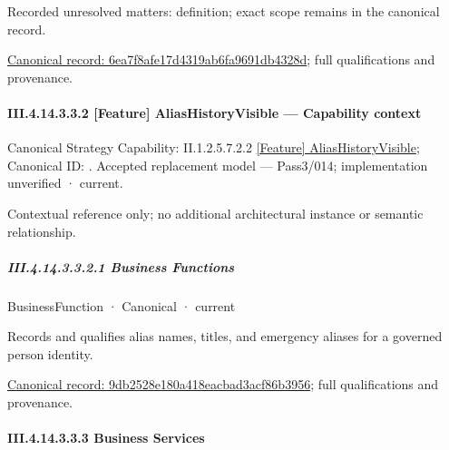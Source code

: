 {\small Recorded unresolved matters: definition; exact scope remains in the canonical record.}\par
{\footnotesize \href{../../../../continuum/business/business-process/6ea7f8afe17d4319ab6fa9691db4328d.md}{Canonical record: 6ea7f8afe17d4319ab6fa9691db4328d}; full qualifications and provenance.}\par
\paragraph*{III.4.14.3.3.2 [Feature] AliasHistoryVisible — Capability context}
\label{navigation:III.4.14.3.3.2}

{\small Canonical Strategy Capability: II.1.2.5.7.2.2 \hyperref[element:5d8ab81e7a9748e9ac611b3c207eef38]{[Feature] AliasHistoryVisible}; Canonical ID: \texttt{}. Accepted replacement model — Pass3/014; implementation unverified · current.}\par
Contextual reference only; no additional architectural instance or semantic relationship.\par
\subparagraph*{III.4.14.3.3.2.1 Business Functions}
\label{navigation:III.4.14.3.3.2.1}

\label{navigation:III.4.14.3.3.2.1.1}

\label{element:9db2528e180a418eacbad3acf86b3956}
{\small BusinessFunction · Canonical · current}\par

Records and qualifies alias names, titles, and emergency aliases for a governed person identity.


{\footnotesize \href{../../../../continuum/business/business-function/9db2528e180a418eacbad3acf86b3956.md}{Canonical record: 9db2528e180a418eacbad3acf86b3956}; full qualifications and provenance.}\par
\paragraph*{III.4.14.3.3.3 Business Services}
\label{navigation:III.4.14.3.3.3}

